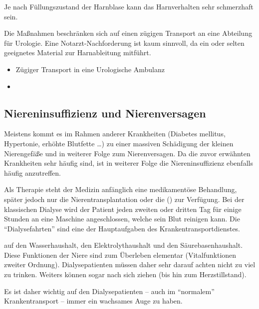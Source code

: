 Je nach Füllungszustand der Harnblase kann das
Harnverhalten sehr schmerzhaft sein.

Die Maßnahmen beschränken sich auf einen zügigen Transport
an eine Abteilung für Urologie. Eine Notarzt-Nachforderung
ist kaum sinnvoll, da ein  oder  selten geeignetes
Material zur Harnableitung mitführt. 

{
\begin{itemize}
    \item Zügiger Transport in eine Urologische Ambulanz
    \item {}
\end{itemize}
}




\subsection{Niereninsuffizienz und Nierenversagen}
\label{topic:cni-therapie-dialyse}
\label{topic:dialysepatienten-gefahren}


Meistens kommt es im Rahmen anderer Krankheiten
(Diabetes mellitus, Hypertonie, erhöhte Blutfette \ldots) zu einer massiven
Schädigung der kleinen Nierengefäße und in weiterer Folge zum Nierenversagen. Da
die zuvor erwähnten Krankheiten sehr häufig sind, ist in weiterer Folge die
Niereninsuffizienz ebenfalls häufig anzutreffen. 

Als Therapie steht der
Medizin anfänglich eine medikamentöse Behandlung, später jedoch nur die
Nierentransplantation oder die 
() zur Verfügung. Bei der
klassischen Dialyse wird der Patient jeden zweiten oder
dritten Tag für einige Stunden an eine Maschine angeschlossen, welche sein
Blut reinigen kann. Die "`Dialysefahrten"' sind eine der
Hauptaufgaben des Krankentransportdienstes. 

 auf den Wasserhaushalt, den
Elektrolythaushalt und den Säurebasenhaushalt. Diese Funktionen der Niere sind zum Überleben elementar (Vitalfunktionen zweiter
Ordnung). Dialysepatienten müssen daher sehr darauf achten
nicht zu viel zu trinken. Weiters können  sogar
 nach sich ziehen (bis hin
zum Herzstillstand).

Es ist daher wichtig auf den
Dialysepatienten -- auch im "`normalem"' Krankentransport --
immer ein wachsames Auge zu haben.







